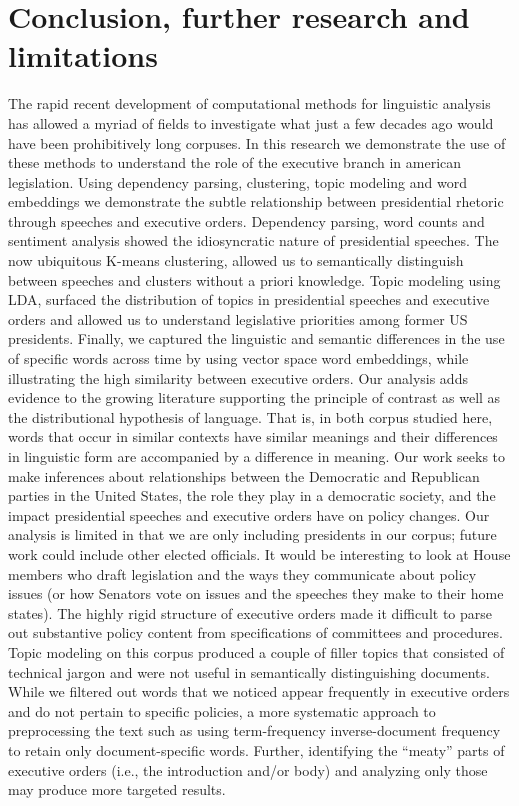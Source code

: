\documentclass{article}
\begin{document}
\section{Conclusion, further research and limitations}{
The rapid recent development of computational methods for linguistic analysis has allowed a myriad of fields to investigate what just a few decades ago would have been prohibitively long corpuses. In this research we demonstrate the use of these methods to understand the role of the executive branch in american legislation. Using dependency parsing, clustering, topic modeling and word embeddings we demonstrate the subtle relationship between presidential rhetoric through speeches and executive orders. Dependency parsing, word counts and sentiment analysis showed the idiosyncratic nature of presidential speeches. The now ubiquitous K-means clustering, allowed us to semantically distinguish between speeches and clusters without a priori knowledge. Topic modeling using LDA, surfaced the distribution of topics in presidential speeches and executive orders and allowed us to understand legislative priorities among former US presidents. Finally, we captured the linguistic and semantic differences in the use of specific words across time by using vector space word embeddings, while illustrating the high similarity between executive orders. Our analysis adds evidence to the growing literature supporting the principle of contrast as well as the distributional hypothesis of language. That is, in both corpus studied here, words that occur in similar contexts have similar meanings and their differences in linguistic form are accompanied by a difference in meaning.  
Our work seeks to make inferences about relationships between the Democratic and Republican parties in the United States, the role they play in a democratic society, and the impact presidential speeches and executive orders have on policy changes. Our analysis is limited in that we are only including presidents in our corpus; future work could include other elected officials. It would be interesting to look at House members who draft legislation and the ways they communicate about policy issues (or how Senators vote on issues and the speeches they make to their home states). 
The highly rigid structure of executive orders made it difficult to parse out substantive policy content from specifications of committees and procedures. Topic modeling on this corpus produced a couple of filler topics that consisted of technical jargon and were not useful in semantically distinguishing documents. While we filtered out words that we noticed appear frequently in executive orders and do not pertain to specific policies, a more systematic approach to preprocessing the text such as using term-frequency inverse-document frequency to retain only document-specific words. Further, identifying the “meaty” parts of executive orders (i.e., the introduction and/or body) and analyzing only those may produce more targeted results. 
}
\end{document}
